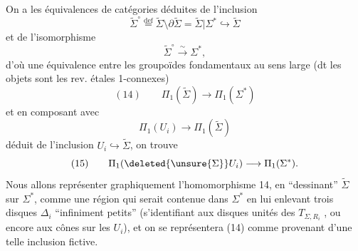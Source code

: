 On a les équivalences de catégories
déduites de l'inclusion
\[
\widetilde\Sigma^\circ \overset{\mathrm{def}}= \widetilde\Sigma\setminus\partial\widetilde\Sigma = \widetilde\Sigma|\Sigma^* \hookrightarrow \widetilde\Sigma
\]
et de l'isomorphisme
\[
\widetilde\Sigma^\circ \xrightarrow{\sim} \Sigma^*,
\]
d'où une équivalence entre les groupoïdes fondamentaux au sens large (dt les objets sont les rev. étales 1-connexes)
\[
(14)\qquad \Pi_1(\widetilde\Sigma) \longrightarrow \Pi_1(\Sigma^*)
\]
et en composant avec
\[
\Pi_1(U_i)\longrightarrow \Pi_1(\widetilde\Sigma)
\]
déduit de l'inclusion $U_i\hookrightarrow\widetilde\Sigma$, on trouve
\[
(15)\qquad \Pi_1(\deleted{\unsure{\Sigma}}U_i)\longrightarrow\Pi_1(\Sigma^*).
\]
Nous allons représenter graphiquement l'homomorphisme 14, en ``dessinant'' $\widetilde\Sigma$ sur $\Sigma^*$, comme une région qui serait contenue dans $\Sigma^*$ en lui enlevant  trois disques  $\Delta_i$ ``infiniment petits''  (s'identifiant aux disques unités des $T_{\Sigma,R_i}$ , ou encore aux cônes sur les $U_i$), et on se représentera (14) comme provenant d'une telle inclusion fictive.
